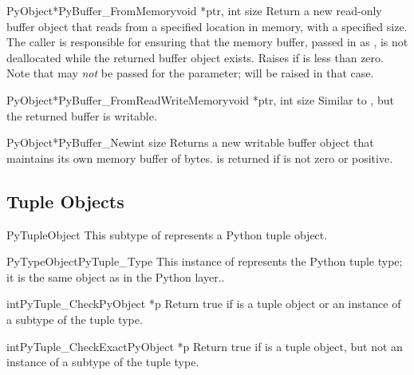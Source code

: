 \begin{cfuncdesc}{PyObject*}{PyBuffer_FromMemory}{void *ptr, int size}
  Return a new read-only buffer object that reads from a specified
  location in memory, with a specified size.  The caller is
  responsible for ensuring that the memory buffer, passed in as
  , is not deallocated while the returned buffer object
  exists.  Raises  if  is less than
  zero.  Note that  may \emph{not} be
  passed for the  parameter;  will be
  raised in that case.
\end{cfuncdesc}

\begin{cfuncdesc}{PyObject*}{PyBuffer_FromReadWriteMemory}{void *ptr, int size}
  Similar to , but the returned
  buffer is writable.
\end{cfuncdesc}

\begin{cfuncdesc}{PyObject*}{PyBuffer_New}{int size}
  Returns a new writable buffer object that maintains its own memory
  buffer of  bytes.   is returned if
   is not zero or positive.
\end{cfuncdesc}


\subsection{Tuple Objects \label{tupleObjects}}

\begin{ctypedesc}{PyTupleObject}
  This subtype of  represents a Python tuple object.
\end{ctypedesc}

\begin{cvardesc}{PyTypeObject}{PyTuple_Type}
  This instance of  represents the Python tuple
  type; it is the same object as  in the Python
  layer..
\end{cvardesc}

\begin{cfuncdesc}{int}{PyTuple_Check}{PyObject *p}
  Return true if  is a tuple object or an instance of a subtype
  of the tuple type.
\end{cfuncdesc}

\begin{cfuncdesc}{int}{PyTuple_CheckExact}{PyObject *p}
  Return true if  is a tuple object, but not an instance of a
  subtype of the tuple type.
\end{cfuncdesc}

